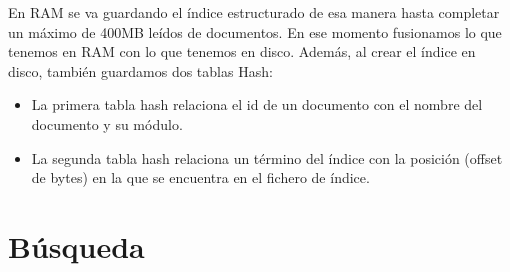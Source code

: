 \documentclass[palatino,nochap]{apuntes}
\begin{document}
En RAM se va guardando el índice estructurado de esa manera hasta completar un máximo de 400MB leídos de documentos. En ese momento fusionamos lo que tenemos en RAM con lo que tenemos en disco. Además, al crear el índice en disco, también guardamos dos tablas Hash:
\begin{itemize}
	\item La primera tabla hash relaciona el id de un documento con el nombre del documento y su módulo.
	\item La segunda tabla hash relaciona un término del índice con la posición (offset de bytes) en la que se encuentra en el fichero de índice.
\end{itemize}


\section{Búsqueda}
\end{document}
